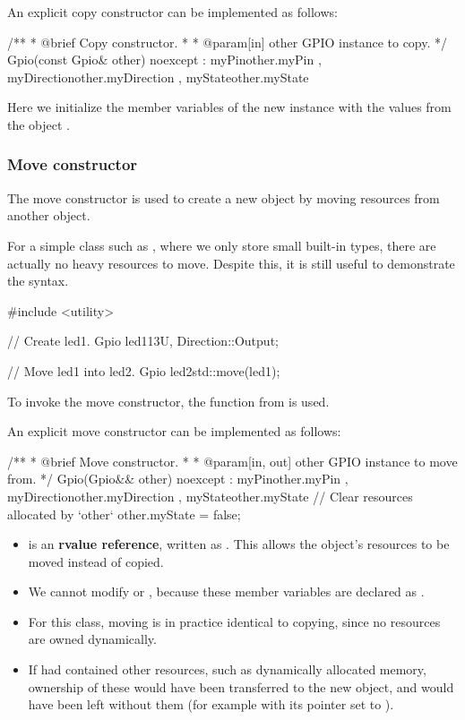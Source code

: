 \noindent An explicit copy constructor can be implemented as follows:

\begin{cppcode}
/**
 * @brief Copy constructor.
 *
 * @param[in] other GPIO instance to copy.
 */
Gpio(const Gpio& other) noexcept
    : myPin{other.myPin}
    , myDirection{other.myDirection}
    , myState{other.myState}
{}
\end{cppcode}

\noindent Here we initialize the member variables of the new instance with the values from the
object .

\subsubsection{Move constructor}
The move constructor is used to create a new object by moving resources from another object.

For a simple class such as , where we only store small built-in types, there are actually
no heavy resources to move. Despite this, it is still useful to demonstrate the syntax.

\begin{cppcode}
#include <utility>

// Create led1.
Gpio led1{13U, Direction::Output};

// Move led1 into led2.
Gpio led2{std::move(led1)};
\end{cppcode}

\note To invoke the move constructor, the function  from  is
used.

An explicit move constructor can be implemented as follows:

\begin{cppcode}
/**
 * @brief Move constructor.
 *
 * @param[in, out] other GPIO instance to move from.
 */
Gpio(Gpio&& other) noexcept
    : myPin{other.myPin}
    , myDirection{other.myDirection}
    , myState{other.myState}
{
    // Clear resources allocated by `other`
    other.myState = false;
}
\end{cppcode}

\note[Notes]
\begin{itemize}
  \item {} is an \textbf{rvalue reference}, written as . This allows the
    object's resources to be moved instead of copied.
  \item We cannot modify  or , because these member
    variables are declared as .
  \item For this class, moving is in practice identical to copying, since no resources are owned
    dynamically.
  \item If  had contained other resources, such as dynamically allocated memory,
    ownership of these would have been transferred to the new object, and  would have
    been left without them (for example with its pointer set to ).
\end{itemize}

